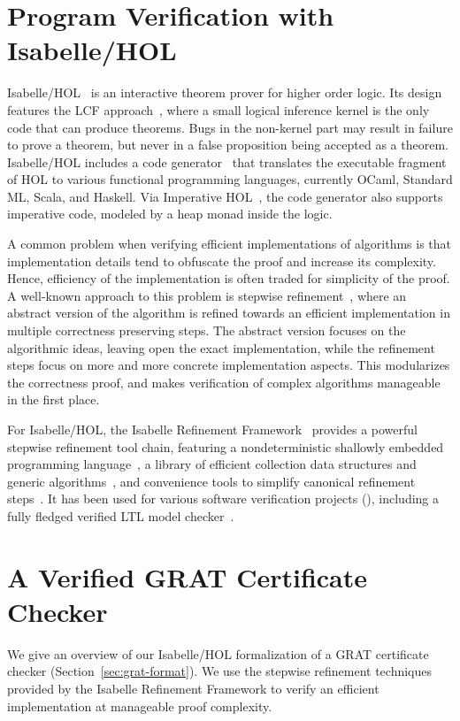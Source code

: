 \documentclass{llncs}
\begin{document}
\section{Program Verification with Isabelle/HOL}\label{sec:imp_ref_framework}
Isabelle/HOL~\cite{NPW02} is an interactive theorem prover for higher order logic. Its design features the LCF approach~\cite{Gord00}, where 
a small logical inference kernel is the only code that can produce theorems. Bugs in the non-kernel part may result in failure to 
prove a theorem, but never in a false proposition being accepted as a theorem.
Isabelle/HOL includes a code generator~\cite{Haft09,HaNi10,HKKN13} that translates the executable fragment of HOL to various functional programming languages, 
currently OCaml, Standard ML, Scala, and Haskell.
Via Imperative HOL~\cite{BKHEM08}, the code generator also supports imperative code, modeled by a heap monad inside the logic.

A common problem when verifying efficient implementations of algorithms is that implementation details tend to obfuscate the proof and increase its complexity. 
Hence, efficiency of the implementation is often traded for simplicity of the proof.
A well-known approach to this problem is stepwise refinement~\cite{Wirth71,Back78,BaWr98}, where an abstract version of the algorithm is refined towards 
an efficient implementation in multiple correctness preserving steps.
The abstract version focuses on the 
algorithmic ideas, leaving open the exact implementation, while the refinement steps focus on more and more concrete implementation aspects.
This modularizes the correctness proof, and makes verification of complex algorithms manageable in the first place.

For Isabelle/HOL, the Isabelle Refinement Framework~\cite{LaTu12,La13,La15,La16} provides a powerful stepwise refinement tool chain, 
featuring a nondeterministic shallowly embedded programming language~\cite{LaTu12}, a library of efficient collection data structures and generic algorithms~\cite{LL10,La15,La16},
and convenience tools to simplify canonical refinement steps~\cite{La13,La15}. It has been used for various software verification projects (\eg \cite{La14,LaSe16,LaNe15}), 
including a fully fledged verified LTL model checker~\cite{ELNN13,BrLa16}.

\section{A Verified GRAT Certificate Checker}\label{sec:grat_verified}
We give an overview of our Isabelle/HOL formalization of a GRAT certificate checker (\cf Section~\ref{sec:grat-format}).
We use the stepwise refinement techniques provided by the Isabelle Refinement Framework to verify an efficient implementation at manageable proof complexity.
\end{document}
